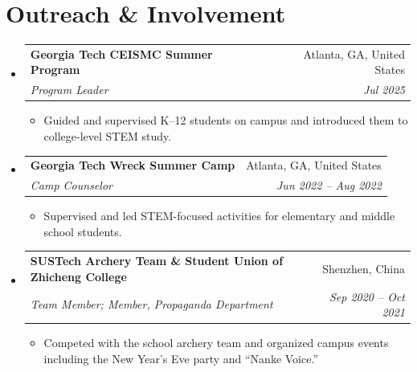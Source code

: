\documentclass[letterpaper,10pt]{article}
\makeatletter
\newcommand{\resumeItem}[1]{
  \item\small{{#1 \vspace{-2pt}}}
}
\newcommand{\resumeSubheading}[4]{
  \vspace{-2pt}\item
  \begin{tabular*}{0.97\textwidth}[t]{l@{\extracolsep{\fill}}r}
    \textbf{#1} & #2 \\
    \textit{\small#3} & \textit{\small #4} \\
  \end{tabular*}\vspace{-7pt}
}
\newcommand{\resumeSubHeadingListStart}{\begin{itemize}[leftmargin=0.15in, label={}]}
\newcommand{\resumeSubHeadingListEnd}{\end{itemize}}
\newcommand{\resumeItemListStart}{\begin{itemize}}
\newcommand{\resumeItemListEnd}{\end{itemize}\vspace{-5pt}}
\makeatother
\begin{document}
\vspace{-6pt}
\section{Outreach \& Involvement}
\vspace{3pt}
\resumeSubHeadingListStart

\resumeSubheading
{Georgia Tech CEISMC Summer Program}{Atlanta, GA, United States}
{Program Leader}{Jul 2025}
\resumeItemListStart
\resumeItem{Guided and supervised K--12 students on campus and introduced them to college-level STEM study.}
\resumeItemListEnd

\resumeSubheading
{Georgia Tech Wreck Summer Camp}{Atlanta, GA, United States}
{Camp Counselor}{Jun 2022 -- Aug 2022}
\resumeItemListStart
\resumeItem{Supervised and led STEM-focused activities for elementary and middle school students.}
\resumeItemListEnd

\resumeSubheading
{SUSTech Archery Team \& Student Union of Zhicheng College}{Shenzhen, China}
{Team Member; Member, Propaganda Department}{Sep 2020 -- Oct 2021}
\resumeItemListStart
\resumeItem{Competed with the school archery team and organized campus events including the New Year's Eve
  party and ``Nanke Voice.''}
\resumeItemListEnd

\resumeSubHeadingListEnd
\end{document}
